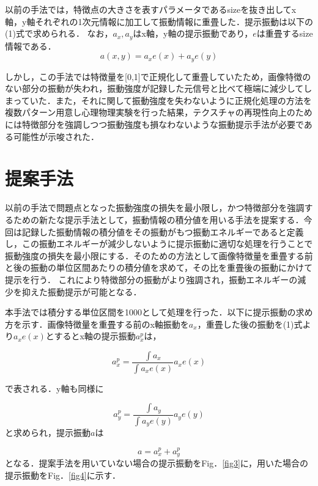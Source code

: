 \documentclass[a4paper]{jarticle}
\begin{document}
以前の手法では，特徴点の大きさを表すパラメータであるsizeを抜き出してx軸，y軸それぞれの1次元情報に加工して振動情報に重畳した．提示振動は以下の(1)式で求められる．
なお，$a_x,a_y$はx軸，y軸の提示振動であり，$e$は重畳するsize情報である．
\begin{equation}
  a(x,y)=a_xe(x)+a_ye(y)
\end{equation}

しかし，この手法では特徴量を[0,1]で正規化して重畳していたため，画像特徴のない部分の振動が失われ，振動強度が記録した元信号と比べて極端に減少してしまっていた．また，それに関して振動強度を失わないように正規化処理の方法を複数パターン用意し心理物理実験を行った結果，テクスチャの再現性向上のためには特徴部分を強調しつつ振動強度も損なわないような振動提示手法が必要である可能性が示唆された\cite{kurogi2019VRSJ}．

\section{提案手法}
以前の手法で問題点となった振動強度の損失を最小限し，かつ特徴部分を強調するための新たな提示手法として，振動情報の積分値を用いる手法を提案する．今回は記録した振動情報の積分値をその振動がもつ振動エネルギーであると定義し，この振動エネルギーが減少しないように提示振動に適切な処理を行うことで振動強度の損失を最小限にする．そのための方法として画像特徴量を重畳する前と後の振動の単位区間あたりの積分値を求めて，その比を重畳後の振動にかけて提示を行う．
これにより特徴部分の振動がより強調され，振動エネルギーの減少を抑えた振動提示が可能となる．

本手法では積分する単位区間を1000として処理を行った．以下に提示振動の求め方を示す．画像特徴量を重畳する前のx軸振動を$a_x$，重畳した後の振動を(1)式より$a_{x}e(x)$とするとx軸の提示振動$a_x^p$は，

\begin{equation}
  a_x^p = \frac{ \int {a_{x}}}{\int {a_{x}e(x)}}a_{x}e(x)
\end{equation}

で表される．y軸も同様に

\begin{equation}
  a_y^p = \frac{ \int {a_{y}}}{\int {a_{y}e(y)}}a_{y}e(y)
\end{equation}
と求められ，提示振動$a$は

\begin{equation}
  a = a_x^p + a_y^p
\end{equation}
となる．提案手法を用いていない場合の提示振動をFig．\ref{fig3}に，用いた場合の提示振動をFig．\ref{fig4}に示す．
\end{document}
